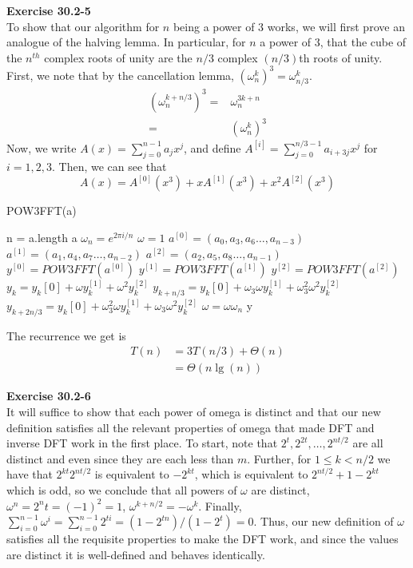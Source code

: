 \documentclass{article}
\begin{document}
\noindent\textbf{Exercise 30.2-5}\\

To show that our algorithm for $n$ being a power of $3$ works, we will first prove an analogue of the halving lemma. In particular, for $n$ a power of 3, that the cube of the $n^{th}$ complex roots of unity are the $n/3$ complex $(n/3)$th roots of unity. First, we note that by the cancellation lemma, $(\omega_{n}^k)^3 = \omega_{n/3}^k$. 
\begin{align*}
(\omega_n^{k+n/3})^3 =& \omega_n^{3k+n}\\
=&(\omega_n^k)^3
\end{align*}
Now, we write $A(x) = \sum_{j=0}^{n-1} a_jx^j$, and define $A^{[i]} = \sum_{j=0}^{n/3-1}a_{i+3j}x^j$ for $i=1,2,3$. Then, we can see that \[A(x) = A^{[0]}(x^3) + x A^{[1]}(x^3) + x^2 A^{[2]}(x^3)\]

\begin{algorithm}
\caption{POW3FFT(a)}
\begin{algorithmic}
\State n = a.length
\State \Return a
\EndIf
\State $\omega_n = e^{2\pi i/n}$
\State $\omega =1$
\State $a^{[0]} = (a_0,a_3,a_6\ldots, a_{n-3})$
\State $a^{[1]} = (a_1,a_4,a_7\ldots, a_{n-2})$
\State $a^{[2]} = (a_2,a_5,a_8\ldots, a_{n-1})$
\State $y^{[0]} = POW3FFT(a^{[0]})$
\State $y^{[1]} = POW3FFT(a^{[1]})$
\State $y^{[2]} = POW3FFT(a^{[2]})$
\State $y_k = y_k[0] +\omega y_k^{[1]} + \omega^2 y_{k}^{[2]}$
\State $y_{k+n/3} = y_k[0] +\omega_3\omega y_k^{[1]} + \omega_3^2\omega^2 y_{k}^{[2]}$
\State $y_{k+2n/3} = y_k[0] +\omega_3^2\omega y_k^{[1]} + \omega_3\omega^2 y_{k}^{[2]}$
\State $\omega = \omega \omega_n$
\EndFor
\State\Return y
\end{algorithmic}
\end{algorithm}

The recurrence we get is
\begin{align*}
T(n) &= 3 T(n/3) + \Theta(n)\\
&= \Theta(n\lg(n))
\end{align*}

\noindent\textbf{Exercise 30.2-6}\\

It will suffice to show that each power of omega is distinct and that our new definition satisfies all the relevant properties of omega that made DFT and inverse DFT work in the first place.  To start, note that $2^t, 2^{2t}, \ldots, 2^{nt/2}$ are all distinct and even since they are each less than $m$.  Further, for $1 \leq k < n/2$ we have that $2^{kt}2^{nt/2}$ is equivalent to $-2^{kt}$, which is equivalent to $2^{nt/2} + 1 - 2^{kt}$ which is odd, so we conclude that all powers of $\omega$ are distinct, $\omega^n = 2^nt = (-1)^2 = 1$, $\omega^{k + n/2} = -\omega^k$.  Finally, $\sum_{i=0}^{n-1} \omega^i = \sum_{i=0}^{n-1} 2^{ti} = (1-2^{tn})/(1-2^t) = 0$.  Thus, our new definition of $\omega$ satisfies all the requisite properties to make the DFT work, and since the values are distinct it is well-defined and behaves identically. \\
\end{document}
